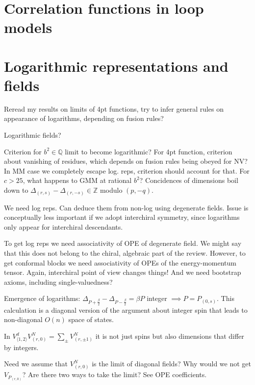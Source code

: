 \documentclass[12pt, a4paper]{article}
\theoremstyle{break}
\begin{document}
\section{Correlation functions in loop models} \label{sec:cloop}

\section{Logarithmic representations and fields} \label{sec:log}

Reread my results on limits of 4pt functions, try to infer general rules on appearance of logarithms, depending on fusion rules?

Logarithmic fields?

Criterion for $b^2\in\mathbb{Q}$ limit to become logarithmic? For 4pt function, criterion about vanishing of residues, which depends on fusion rules being obeyed for NV? In MM case we completely escape log. reps, criterion should account for that.  
For $c>25$, what happens to GMM at rational $b^2$? Concidences of dimensions boil down to $\Delta_{(r,s)}-\Delta_{(r,-s)} \in \mathbb{Z}$ modulo $(p, -q)$. 

We need log reps. Can deduce them from non-log using degenerate fields. Issue is conceptually less important if we adopt interchiral symmetry, since logarithms only appear for interchiral descendants. 

To get log reps we need associativity of OPE of degenerate field. We might say that this does not belong to the chiral, algebraic part of the review. However, to get conformal blocks we need associativity of OPEs of the energy-momentum tensor. Again, interchiral point of view changes things! And we need bootstrap axioms, including single-valuedness? 

Emergence of logarithms: $\Delta_{P+\frac{\beta}{2}}-\Delta_{P-\frac{\beta}{2}} = \beta P$ integer $\implies P=P_{(0,s)}$. This calculation is a diagonal version of the argument about integer spin that leads to non-diagonal $O(n)$ space of states.

In $V^d_{\langle 1,2\rangle}V^N_{(r,0)} = \sum_\pm V^N_{(r,\pm 1)}$ it is not just spins but also dimensions that differ by integers. 

Need we assume that $V^N_{(r,0)}$ is the limit of diagonal fields? Why would we not get $V_{P_{(r,0)}}$? Are there two ways to take the limit? See OPE coefficients. 




%
\end{document}

